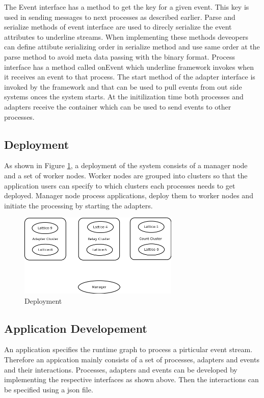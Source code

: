  The Event interface has a method to get the key for a given event. This key is used in sending messages to next processes as described earlier. Parse and serialize methods of event interface are used to direcly serialize the event attributes to underline streams. When implementing these methods deveopers can define attibute serializing order in serialize method and use same order at the parse method to avoid meta data passing with the binary format. Process interface has a method called onEvent which underline framework invokes when it receives an event to that process. The start method of the adapter interface is invoked by the framework and that can be used to pull events from out side systems onces the system starts. At the initilization time both processes and adapters receive the container which can be used to send events to other processes.
 
 \subsection{Deployment}

As shown in Figure \ref{deployment}, a deployment of the system consists of a manager node and a set of worker nodes. Worker nodes are grouped into clusters so that the application users can specify to which clusters each processes needs to get deployed. Manager node process applications, deploy them to worker nodes and initiate the processing by starting the adapters.

\begin{figure}[!t]
        \centering
        \includegraphics[width=3.0in]{deployment.png}
        \caption{Deployment}
        \label{deployment}
\end{figure}

\subsection{Application Developement}

An application specifies the runtime graph to process a pirticular event stream. Therefore an appication mainly consists of a set of processes, adapters and events and their interactions. Processes, adapters and events can be developed by implementing the respective interfaces as shown above. Then the interactions can be specified using a json file. 

